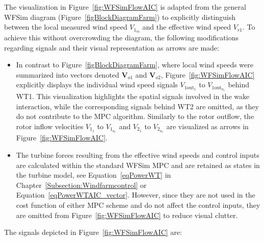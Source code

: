 The visualization in Figure~\ref{fig:WFSimFlowAIC} is adapted from the general WFSim diagram (Figure~\ref{figBlockDiagramFarm}) to explicitly distinguish between the local measured wind speed $V_{1_m}$ and the effective wind speed $V_{r1}$. To achieve this without overcrowding the diagram, the following modifications regarding signals and their visual representation as arrows are made:
\begin{itemize}
    \item In contrast to Figure~\ref{figBlockDiagramFarm}, where local wind speeds were summarized into vectors denoted $\bm{V}_{o1}$ and $\bm{V}_{o2}$, Figure~\ref{fig:WFSimFlowAIC} explicitly displays the individual wind speed signals $V_{1\text{out}_1}$ to $V_{1\text{out}_{n_r}}$ behind WT1. This visualization highlights the spatial signals involved in the wake interaction, while the corresponding signals behind WT2 are omitted, as they do not contribute to the MPC algorithm. Similarly to the rotor outflow, the rotor inflow velocities $V_{1_1}$ to $V_{1_{n_r}}$ and  $V_{2_1}$ to $V_{2_{n_r}}$ are visualized as arrows in Figure~\ref{fig:WFSimFlowAIC}.
    \item The turbine forces resulting from the effective wind speeds and control inputs are calculated within the standard WFSim MPC and are retained as states in the turbine model, see Equation~\eqref{eqPowerWT} in Chapter~\ref{Subsection:Windfarmcontrol} or Equation~\eqref{eqPowerWTAIC_vector}. However, since they are not used in the cost function of either MPC scheme and do not affect the control inputs, they are omitted from Figure~\ref{fig:WFSimFlowAIC} to reduce visual clutter.
\end{itemize}
%
The signals depicted in Figure~\ref{fig:WFSimFlowAIC} are:
